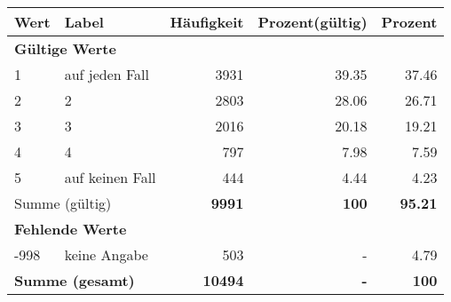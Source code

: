      \begin{longtable}{lXrrr}
     \toprule
     \textbf{Wert} & \textbf{Label} & \textbf{Häufigkeit} & \textbf{Prozent(gültig)} & \textbf{Prozent} \\
     \endhead
     \midrule
     \multicolumn{5}{l}{\textbf{Gültige Werte}}\\

     1 &
     \multicolumn{1}{X}{ auf jeden Fall   } &


       \num{3931} &
       \num[round-mode=places,round-precision=2]{39,35} &
         \num[round-mode=places,round-precision=2]{37,46} \\

     2 &
     \multicolumn{1}{X}{ 2   } &


       \num{2803} &
       \num[round-mode=places,round-precision=2]{28,06} &
         \num[round-mode=places,round-precision=2]{26,71} \\

     3 &
     \multicolumn{1}{X}{ 3   } &


       \num{2016} &
       \num[round-mode=places,round-precision=2]{20,18} &
         \num[round-mode=places,round-precision=2]{19,21} \\

     4 &
     \multicolumn{1}{X}{ 4   } &


       \num{797} &
       \num[round-mode=places,round-precision=2]{7,98} &
         \num[round-mode=places,round-precision=2]{7,59} \\

     5 &
     \multicolumn{1}{X}{ auf keinen Fall   } &


       \num{444} &
       \num[round-mode=places,round-precision=2]{4,44} &
         \num[round-mode=places,round-precision=2]{4,23} \\
     \midrule
     \multicolumn{2}{l}{Summe (gültig)} &
       \textbf{\num{9991}} &
     \textbf{100} &
       \textbf{\num[round-mode=places,round-precision=2]{95,21}} \\
     \multicolumn{5}{l}{\textbf{Fehlende Werte}}\\
       -998 &
       keine Angabe &
         \num{503} &
        - &
         \num[round-mode=places,round-precision=2]{4,79} \\
     \midrule
     \multicolumn{2}{l}{\textbf{Summe (gesamt)}} &
          \textbf{\num{10494}} &
        \textbf{-} &
        \textbf{100} \\
     \bottomrule
     \end{longtable}
     
